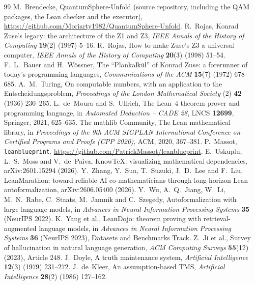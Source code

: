 \begingroup\small
\begin{thebibliography}{99}
\setlength{\itemsep}{1pt}
 M.~Brendecke, QuantumSphere-Unfold (source repository, including the QAM packages, the Lean checker and the executor),
\url{https://github.com/Moriarty1982/QuantumSphere-Unfold}.
 R.~Rojas, Konrad Zuse's legacy: the architecture of the Z1 and Z3, \emph{IEEE Annals of the History of Computing}
\textbf{19}(2) (1997) 5--16.
 R.~Rojas, How to make Zuse's Z3 a universal computer, \emph{IEEE Annals of the History of Computing} \textbf{20}(3)
(1998) 51--54.
 F.~L.~Bauer and H.~W\"ossner, The ``Plankalk\"ul'' of Konrad Zuse: a forerunner of today's programming languages,
\emph{Communications of the ACM} \textbf{15}(7) (1972) 678--685.
 A.~M.~Turing, On computable numbers, with an application to the Entscheidungsproblem, \emph{Proceedings of the London
Mathematical Society} (2) \textbf{42} (1936) 230--265.
 L.~de~Moura and S.~Ullrich, The Lean~4 theorem prover and programming language, in \emph{Automated Deduction -- CADE 28},
LNCS \textbf{12699}, Springer, 2021, 625--635.
 The mathlib Community, The Lean mathematical library, in \emph{Proceedings of the 9th ACM SIGPLAN International
Conference on Certified Programs and Proofs (CPP 2020)}, ACM, 2020, 367--381.
 P.~Massot, \texttt{leanblueprint}, \url{https://github.com/PatrickMassot/leanblueprint}.
 E.~Uskuplu, L.~S.~Moss and V.~de~Paiva, KnowTeX: visualizing mathematical dependencies, arXiv:2601.15294 (2026).
 Y.~Zhang, Y.~Sun, T.~Suzuki, J.~D.~Lee and F.~Liu, LeanMarathon: toward reliable AI co-mathematicians through
long-horizon Lean autoformalization, arXiv:2606.05400 (2026).
 Y.~Wu, A.~Q.~Jiang, W.~Li, M.~N.~Rabe, C.~Staats, M.~Jamnik and C.~Szegedy, Autoformalization with large language
models, in \emph{Advances in Neural Information Processing Systems} \textbf{35} (NeurIPS 2022).
 K.~Yang et al., LeanDojo: theorem proving with retrieval-augmented language models, in \emph{Advances in Neural
Information Processing Systems} \textbf{36} (NeurIPS 2023), Datasets and Benchmarks Track.
 Z.~Ji et al., Survey of hallucination in natural language generation, \emph{ACM Computing Surveys} \textbf{55}(12) (2023),
Article 248.
 J.~Doyle, A truth maintenance system, \emph{Artificial Intelligence} \textbf{12}(3) (1979) 231--272.
 J.~de~Kleer, An assumption-based TMS, \emph{Artificial Intelligence} \textbf{28}(2) (1986) 127--162.

\end{thebibliography}
